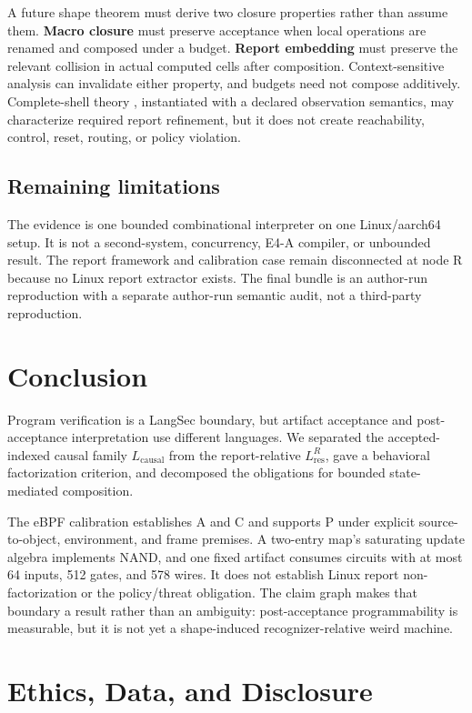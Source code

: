 \documentclass[conference]{IEEEtran}
\begin{document}
A future shape theorem must derive two closure properties rather than assume them. \textbf{Macro closure} must preserve acceptance when local operations are renamed and composed under a budget. \textbf{Report embedding} must preserve the relevant collision in actual computed cells after composition. Context-sensitive analysis can invalidate either property, and budgets need not compose additively. Complete-shell theory \cite{ref17}, instantiated with a declared observation semantics, may characterize required report refinement, but it does not create reachability, control, reset, routing, or policy violation.

\subsection{Remaining limitations}

The evidence is one bounded combinational interpreter on one Linux/aarch64 setup. It is not a second-system, concurrency, E4-A compiler, or unbounded result. The report framework and calibration case remain disconnected at node R because no Linux report extractor exists. The final bundle is an author-run reproduction with a separate author-run semantic audit, not a third-party reproduction.

\section{Conclusion}

Program verification is a LangSec boundary, but artifact acceptance and post-acceptance interpretation use different languages. We separated the accepted-indexed causal family $L_{\mathrm{causal}}$ from the report-relative $L_{\mathrm{res}}^R$, gave a behavioral factorization criterion, and decomposed the obligations for bounded state-mediated composition.

The eBPF calibration establishes A and C and supports P under explicit source-to-object, environment, and frame premises. A two-entry map's saturating update algebra implements NAND, and one fixed artifact consumes circuits with at most 64 inputs, 512 gates, and 578 wires. It does not establish Linux report non-factorization or the policy/threat obligation. The claim graph makes that boundary a result rather than an ambiguity: post-acceptance programmability is measurable, but it is not yet a shape-induced recognizer-relative weird machine.

\section*{Ethics, Data, and Disclosure}
\end{document}
